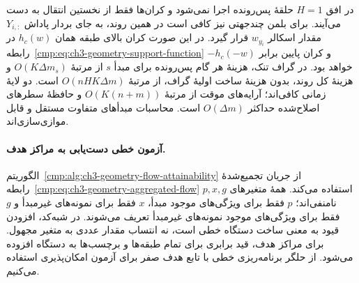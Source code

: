 در افق $H=1$ حلقهٔ پس‌رونده اجرا نمی‌شود و کران‌ها فقط از نخستین انتقال به دست می‌آیند. برای بلمن چندجهتی نیز کافی است در همین روند، به جای بردار پاداش $Y_{i,:}$ مقدار اسکالر $w_{y_i}$ قرار گیرد. در این صورت کران بالای طبقه همان $h_c(w)$ در رابطه~\eqref{cmp:eq:ch3-geometry-support-function} و کران پایین برابر $-h_c(-w)$ خواهد بود. در گراف تنک، هزینهٔ هر گام پس‌رونده برای مبدأ $s$ از مرتبهٔ $O(K\Delta m_s)$ و هزینهٔ کل روند، بدون هزینهٔ ساخت اولیهٔ گراف، از مرتبهٔ $O(nHK\Delta m)$ است. دو لایهٔ زمانی کافی‌اند؛ آرایه‌های موقت از مرتبهٔ $O(K(n+m))$ و حافظهٔ سطرهای اصلاح‌شده حداکثر $O(\Delta m)$ است. محاسبات مبدأهای متفاوت مستقل و قابل موازی‌سازی‌اند.

\paragraph{آزمون خطی دست‌یابی به مراکز هدف.}
الگوریتم~\ref{cmp:alg:ch3-geometry-flow-attainability} از جریان تجمیع‌شدهٔ رابطه~\eqref{cmp:eq:ch3-geometry-aggregated-flow} استفاده می‌کند. همهٔ متغیرهای $p,x,g$ نامنفی‌اند؛ $p$ فقط برای ویژگی‌های موجود مبدأ، $x$ فقط برای نمونه‌های غیرمبدأ و $g$ فقط برای ویژگی‌های موجود نمونه‌های غیرمبدأ تعریف می‌شوند. در شبه‌کد، افزودن قیود به معنی ساخت دستگاه خطی است، نه انتساب مقدار عددی به متغیر مجهول. برای مراکز هدف، قید برابری برای تمام طبقه‌ها و برچسب‌ها به دستگاه افزوده می‌شود. از حلگر برنامه‌ریزی خطی با تابع هدف صفر برای آزمون امکان‌پذیری استفاده می‌کنیم.

